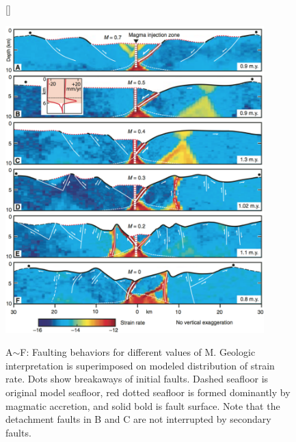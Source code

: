 \begin{figure}[H]
[\FBwidth]
{\caption{\small A$\sim$F: Faulting behaviors for different values of M. Geologic interpretation is superimposed on modeled distribution of strain rate. Dots show breakaways of initial faults. Dashed seafloor is original model seafloor, red dotted seafloor is formed dominantly by magmatic accretion, and solid bold is fault surface. Note that the detachment faults in B and C are not interrupted by secondary faults. \citep{Tucholke2008}}}
 {\includegraphics[width=10cm]{./Figures/fig_Intro6_1.png}} 
 \label{fig_Intro6_1}
\end{figure}

